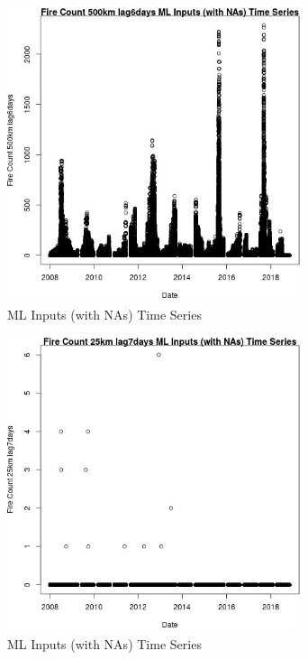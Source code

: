 \begin{figure} 
\centering  
\includegraphics[width=0.77\textwidth]{Code_Outputs/Report_ML_input_PM25_Step4_part_e_de_duplicated_aves_compiled_2019-05-20wNAs_Fire_Count_500km_lag6daysvDate.jpg} 
\caption{\label{fig:Report_ML_input_PM25_Step4_part_e_de_duplicated_aves_compiled_2019-05-20wNAsFire_Count_500km_lag6daysvDate}ML Inputs (with NAs) Time Series} 
\end{figure} 
 

\begin{figure} 
\centering  
\includegraphics[width=0.77\textwidth]{Code_Outputs/Report_ML_input_PM25_Step4_part_e_de_duplicated_aves_compiled_2019-05-20wNAs_Fire_Count_25km_lag7daysvDate.jpg} 
\caption{\label{fig:Report_ML_input_PM25_Step4_part_e_de_duplicated_aves_compiled_2019-05-20wNAsFire_Count_25km_lag7daysvDate}ML Inputs (with NAs) Time Series} 
\end{figure} 
 

